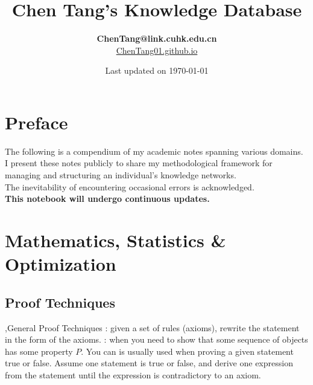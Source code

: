 \documentclass[10pt]{report}
\title{\textbf{Chen Tang's \break Knowledge Database}}
\author{
    \textbf{ChenTang@link.cuhk.edu.cn} \\
    \url{ChenTang01.github.io}
}
\date{Last updated on \today}
\begin{document}
\maketitle

\chapter*{Preface}
\begin{center}
    {\Large The following is a compendium of my academic notes
        spanning various domains.
        I present these notes
        publicly to share my methodological framework for
        managing and structuring an individual's knowledge
        networks.\\
        The inevitability of encountering
        occasional errors is acknowledged.\\
        \bigskip
        \textbf{This notebook will undergo continuous updates.}}
\end{center}

\tableofcontents

\chapter{Mathematics, Statistics \& Optimization}

\section{Proof Techniques}

\sep{General Proof Techniques}
: given a set of rules (axioms), rewrite the statement in the form of the axioms.
: when you need to show that some sequence of objects has some property $P$. You can
 is usually used when proving a given statement true or false. Assume one statement is true or false, and derive one expression from the statement until the expression is contradictory to an axiom.
\end{document}
